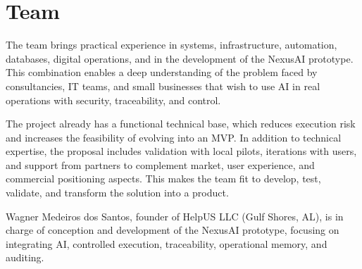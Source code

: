 \section{Team}

The team brings practical experience in systems, infrastructure, automation, databases, digital operations, and in the development of the NexusAI prototype. This combination enables a deep understanding of the problem faced by consultancies, IT teams, and small businesses that wish to use AI in real operations with security, traceability, and control.

The project already has a functional technical base, which reduces execution risk and increases the feasibility of evolving into an MVP. In addition to technical expertise, the proposal includes validation with local pilots, iterations with users, and support from partners to complement market, user experience, and commercial positioning aspects. This makes the team fit to develop, test, validate, and transform the solution into a product.

Wagner Medeiros dos Santos, founder of HelpUS LLC (Gulf Shores, AL), is in charge of conception and development of the NexusAI prototype, focusing on integrating AI, controlled execution, traceability, operational memory, and auditing.
